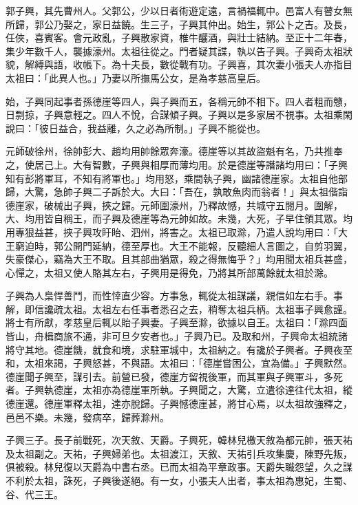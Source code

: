 


郭子興，其先曹州人。父郭公，少以日者術遊定遠，言禍福輒中。邑富人有瞽女無所歸，郭公乃娶之，家日益饒。生三子，子興其仲出。始生，郭公卜之吉。及長，任俠，喜賓客。會元政亂，子興散家資，椎牛釃酒，與壯士結納。至正十二年春，集少年數千人，襲據濠州。太祖往從之。門者疑其諜，執以告子興。子興奇太祖狀貌，解縛與語，收帳下。為十夫長，數從戰有功。子興喜，其次妻小張夫人亦指目太祖曰：「此異人也。」乃妻以所撫馬公女，是為孝慈高皇后。

始，子興同起事者孫德崖等四人，與子興而五，各稱元帥不相下。四人者粗而戇，日剽掠，子興意輕之。四人不悅，合謀傾子興。子興以是多家居不視事。太祖乘閑說曰：「彼日益合，我益離，久之必為所制。」子興不能從也。

元師破徐州，徐帥彭大、趙均用帥餘眾奔濠。德崖等以其故盜魁有名，乃共推奉之，使居己上。大有智數，子興與相厚而薄均用。於是德崖等譖諸均用曰：「子興知有彭將軍耳，不知有將軍也。」均用怒，乘間執子興，幽諸德崖家。太祖自他部歸，大驚，急帥子興二子訴於大。大曰：「吾在，孰敢魚肉而翁者！」與太祖偕詣德崖家，破械出子興，挾之歸。元師圍濠州，乃釋故憾，共城守五閱月。圍解，大、均用皆自稱王，而子興及德崖等為元帥如故。未幾，大死，子早住領其眾。均用專狠益甚，挾子興攻盱眙、泗州，將害之。太祖已取滁，乃遣人說均用曰：「大王窮迫時，郭公開門延納，德至厚也。大王不能報，反聽細人言圖之，自剪羽翼，失豪傑心，竊為大王不取。且其部曲猶眾，殺之得無悔乎？」均用聞太祖兵甚盛，心憚之，太祖又使人賂其左右，子興用是得免，乃將其所部萬餘就太祖於滁。

子興為人梟悍善鬥，而性悻直少容。方事急，輒從太祖謀議，親信如左右手。事解，即信讒疏太祖。太祖左右任事者悉召之去，稍奪太祖兵柄。太祖事子興愈謹。將士有所獻，孝慈皇后輒以貽子興妻。子興至滁，欲據以自王。太祖曰：「滁四面皆山，舟楫商旅不通，非可旦夕安者也。」子興乃已。及取和州，子興命太祖統諸將守其地。德崖饑，就食和境，求駐軍城中，太祖納之。有讒於子興者。子興夜至和，太祖來謁，子興怒甚，不與語。太祖曰：「德崖嘗困公，宜為備。」子興默然。德崖聞子興至，謀引去。前營已發，德崖方留視後軍，而其軍與子興軍斗，多死者。子興執德崖，太祖亦為德崖軍所執。子興聞之，大驚，立遣徐達往代太祖，縱德崖還。德崖軍釋太祖，達亦脫歸。子興憾德崖甚，將甘心焉，以太祖故強釋之，邑邑不樂。未幾，發病卒，歸葬滁州。

子興三子。長子前戰死，次天敘、天爵。子興死，韓林兒檄天敘為都元帥，張天祐及太祖副之。天祐，子興婦弟也。太祖渡江，天敘、天祐引兵攻集慶，陳野先叛，俱被殺。林兒復以天爵為中書右丞。已而太祖為平章政事。天爵失職怨望，久之謀不利於太祖，誅死，子興後遂絕。有一女，小張夫人出者，事太祖為惠妃，生蜀、谷、代三王。

